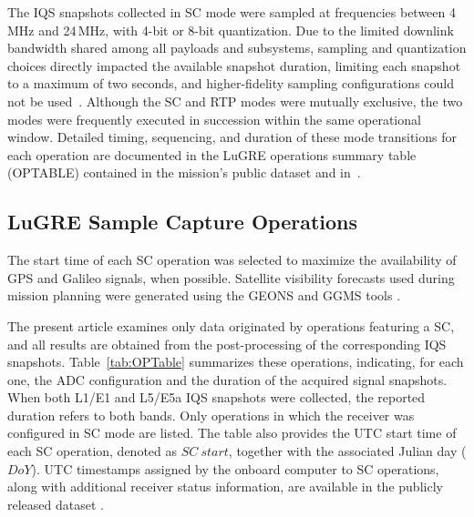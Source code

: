 \documentclass{IEEEtaes}
\begin{document}
The \gls{IQS} snapshots collected in \gls{SC} mode were sampled at frequencies between 4\,MHz and 24\,MHz, with 4-bit or 8-bit quantization. Due to the limited downlink bandwidth shared among all payloads and subsystems, sampling and quantization choices directly impacted the available snapshot duration, limiting each snapshot to a maximum of two seconds, and higher-fidelity sampling configurations could not be used~\cite{nardin2023tracking}. Although the \gls{SC} and \gls{RTP} modes were mutually exclusive, the two modes were frequently executed in succession within the same operational window. Detailed timing, sequencing, and duration of these mode transitions for each operation are documented in the \gls{LuGRE} operations summary table (OPTABLE) contained in the mission’s public dataset \cite{parker2025lunar} and in~\cite{JournalDiMissione}.


\subsection{LuGRE Sample Capture Operations}
The start time of each \gls{SC} operation was selected to maximize the availability of \gls{GPS} and Galileo signals, when possible. Satellite visibility forecasts used during mission planning were generated using the \gls{GEONS} and \gls{GGMS} tools \cite{JournalDiMissione}.

The present article examines only data originated by operations featuring a \gls{SC}, and all results are obtained from the post-processing of the corresponding \gls{IQS} snapshots. Table~\ref{tab:OPTable} summarizes these operations, indicating, for each one, the \gls{ADC} configuration and the duration of the acquired signal snapshots. When both L1/E1 and L5/E5a \gls{IQS} snapshots were collected, the reported duration refers to both bands. Only operations in which the receiver was configured in \gls{SC} mode are listed.
The table also provides the \gls{UTC} start time of each \gls{SC} operation, denoted as $SC\ start$, together with the associated Julian day ($DoY$). \gls{UTC} timestamps assigned by the onboard computer to \gls{SC} operations, along with additional receiver status information, are available in the publicly released dataset \cite{parker2025lunar}.
\end{document}
